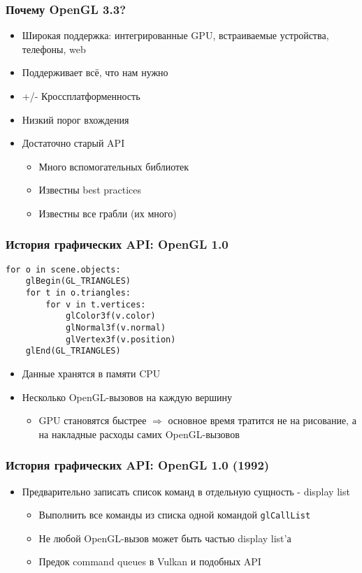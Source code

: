 \documentclass{beamer}
\begin{document}
\begin{frame}
\frametitle{Почему OpenGL 3.3?}
\pause
\begin{itemize}
\item Широкая поддержка: интегрированные GPU, встраиваемые устройства, телефоны, web
\pause
\item Поддерживает всё, что нам нужно
\pause
\item +/- Кроссплатформенность
\pause
\item Низкий порог вхождения
\pause
\item Достаточно старый API
\begin{itemize}
\item Много вспомогательных библиотек
\item Известны best practices
\item Известны все грабли \pause (их много)
\end{itemize}
\end{itemize}
\end{frame}

\begin{frame}[fragile]
\frametitle{История графических API: OpenGL 1.0}
\begin{verbatim}
for o in scene.objects:
    glBegin(GL_TRIANGLES)
    for t in o.triangles:
        for v in t.vertices:
            glColor3f(v.color)
            glNormal3f(v.normal)
            glVertex3f(v.position)
    glEnd(GL_TRIANGLES)
\end{verbatim}
\pause
\begin{itemize}
\item Данные хранятся в памяти CPU
\pause
\item Несколько OpenGL-вызовов на каждую вершину
\pause
\begin{itemize}
\item GPU становятся быстрее $\Longrightarrow$ основное время тратится не на рисование, а на накладные расходы самих OpenGL-вызовов
\end{itemize}
\end{itemize}
\end{frame}

\begin{frame}[fragile]
\frametitle{История графических API: OpenGL 1.0 (1992)}
\begin{itemize}
\item Предварительно записать список команд в отдельную сущность - display list
\begin{itemize}
\item Выполнить все команды из списка одной командой \verb|glCallList|
\item Не любой OpenGL-вызов может быть частью display list'а
\item Предок command queues в Vulkan и подобных API
\end{itemize}
\end{itemize}
\end{frame}
\end{document}
